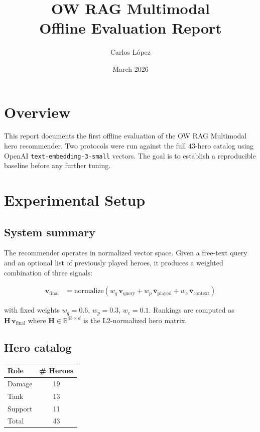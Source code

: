 \documentclass[11pt, a4paper]{article}
\title{\textbf{OW RAG Multimodal}\\[0.4em]
\large Offline Evaluation Report}
\author{Carlos L\'opez}
\date{March 2026}
\begin{document}
\maketitle

\section*{Overview}

This report documents the first offline evaluation of the OW RAG Multimodal hero
recommender.  Two protocols were run against the full 43-hero catalog using
OpenAI \texttt{text-embedding-3-small} vectors.  The goal is to establish a
reproducible baseline before any further tuning.

\section{Experimental Setup}

\subsection{System summary}

The recommender operates in normalized vector space.  Given a free-text query
and an optional list of previously played heroes, it produces a weighted
combination of three signals:

\begin{align}
\mathbf{v}_\text{final} &= \text{normalize}\!\left(
  w_q\,\mathbf{v}_\text{query}
  + w_p\,\bar{\mathbf{v}}_\text{played}
  + w_c\,\bar{\mathbf{v}}_\text{context}
\right) \label{eq:fusion}
\end{align}

with fixed weights $w_q = 0.6$, $w_p = 0.3$, $w_c = 0.1$.
Rankings are computed as $\mathbf{H}\,\mathbf{v}_\text{final}$ where
$\mathbf{H} \in \mathbb{R}^{43 \times d}$ is the L2-normalized hero matrix.

\subsection{Hero catalog}

\begin{center}
\begin{tabular}{lc}
\toprule
Role    & \# Heroes \\
\midrule
Damage  & 19 \\
Tank    & 13 \\
Support & 11 \\
\midrule
Total   & 43 \\
\bottomrule
\end{tabular}
\end{center}
\end{document}
